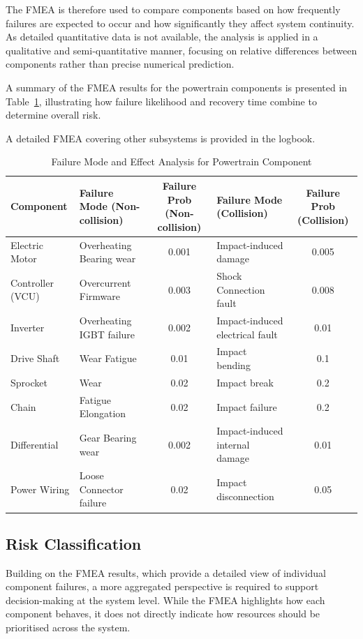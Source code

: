 \documentclass[11pt, a4paper]{report}
\numberwithin{equation}{section}
\begin{document}
The FMEA is therefore used to compare components based on how frequently failures are expected to occur and how significantly they affect system continuity. As detailed quantitative data is not available, the analysis is applied in a qualitative and semi-quantitative manner, focusing on relative differences between components rather than precise numerical prediction.

A summary of the FMEA results for the powertrain components is presented in Table~\ref{tab:fmea}, illustrating how failure likelihood and recovery time combine to determine overall risk.

A detailed FMEA covering other subsystems is provided in the logbook.

\begin{table}[H]
\centering
\small
\renewcommand{\arraystretch}{1.5}

\caption{Failure Mode and Effect Analysis for Powertrain Component}
\label{tab:fmea}

\begin{tabularx}{\textwidth}{l X c X c}
\toprule
Component & Failure Mode (Non-collision) & Failure Prob (Non-collision) & Failure Mode (Collision) & Failure Prob (Collision) \\
\midrule
Electric Motor & Overheating Bearing wear & 0.001 & Impact-induced damage & 0.005 \\
Controller (VCU) & Overcurrent Firmware & 0.003 & Shock Connection fault & 0.008 \\
Inverter & Overheating IGBT failure & 0.002 & Impact-induced electrical fault & 0.01 \\
Drive Shaft & Wear Fatigue & 0.01 & Impact bending & 0.1 \\
Sprocket & Wear & 0.02 & Impact break & 0.2 \\
Chain & Fatigue Elongation & 0.02 & Impact failure & 0.2 \\
Differential & Gear Bearing wear & 0.002 & Impact-induced internal damage & 0.01 \\
Power Wiring & Loose Connector failure & 0.02 & Impact disconnection & 0.05 \\
\bottomrule
\end{tabularx}
\end{table}

\subsection{Risk Classification}

Building on the FMEA results, which provide a detailed view of individual component failures, a more aggregated perspective is required to support decision-making at the system level. While the FMEA highlights how each component behaves, it does not directly indicate how resources should be prioritised across the system.
\end{document}
